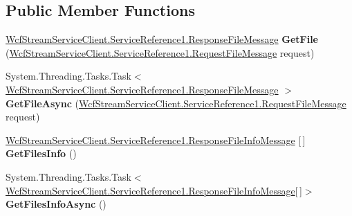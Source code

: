\subsection*{Public Member Functions}
\begin{DoxyCompactItemize}
\item 
\mbox{\label{interface_wcf_stream_service_client_1_1_service_reference1_1_1_i_strumien_a12c29df0ed15188c2343a27e84b76367}} 
\hyperlink{class_wcf_stream_service_client_1_1_service_reference1_1_1_response_file_message}{Wcf\+Stream\+Service\+Client.\+Service\+Reference1.\+Response\+File\+Message} {\bfseries Get\+File} (\hyperlink{class_wcf_stream_service_client_1_1_service_reference1_1_1_request_file_message}{Wcf\+Stream\+Service\+Client.\+Service\+Reference1.\+Request\+File\+Message} request)
\item 
\mbox{\label{interface_wcf_stream_service_client_1_1_service_reference1_1_1_i_strumien_ad5c61d72cb3b88887b4435d74f498761}} 
System.\+Threading.\+Tasks.\+Task$<$ \hyperlink{class_wcf_stream_service_client_1_1_service_reference1_1_1_response_file_message}{Wcf\+Stream\+Service\+Client.\+Service\+Reference1.\+Response\+File\+Message} $>$ {\bfseries Get\+File\+Async} (\hyperlink{class_wcf_stream_service_client_1_1_service_reference1_1_1_request_file_message}{Wcf\+Stream\+Service\+Client.\+Service\+Reference1.\+Request\+File\+Message} request)
\item 
\mbox{\label{interface_wcf_stream_service_client_1_1_service_reference1_1_1_i_strumien_af084dc3fdf850a0d484319437c7c3433}} 
\hyperlink{class_wcf_stream_service_client_1_1_service_reference1_1_1_response_file_info_message}{Wcf\+Stream\+Service\+Client.\+Service\+Reference1.\+Response\+File\+Info\+Message} \mbox{[}$\,$\mbox{]} {\bfseries Get\+Files\+Info} ()
\item 
\mbox{\label{interface_wcf_stream_service_client_1_1_service_reference1_1_1_i_strumien_a95983e0dbe2b970b39aa6b27f07b21fd}} 
System.\+Threading.\+Tasks.\+Task$<$ \hyperlink{class_wcf_stream_service_client_1_1_service_reference1_1_1_response_file_info_message}{Wcf\+Stream\+Service\+Client.\+Service\+Reference1.\+Response\+File\+Info\+Message}\mbox{[}$\,$\mbox{]}$>$ {\bfseries Get\+Files\+Info\+Async} ()

\end{DoxyCompactItemize}
